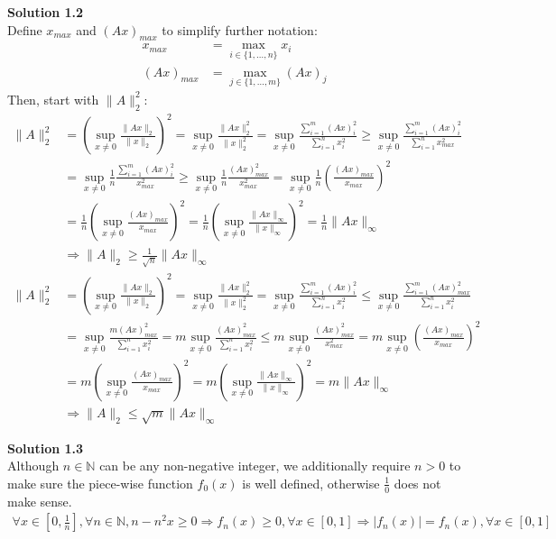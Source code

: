 \documentclass[fleqn, 10.5pt, a4paper]{article}
\def\N{{\mathbb N}}
\theoremstyle{definition}
\numberwithin{equation}{section}
\newcommand{\supx}{\sup_{x\neq0}}
\begin{document}
\noindent \textbf {Solution 1.2} \\
Define $x_{max}$ and $\left(Ax\right)_{max}$ to simplify further notation:
\begin{align*}
	x_{max} &= \max_{i\in\{1,\dots,n\}} x_i \\
	\left(Ax\right)_{max} &= \max_{j\in\{1,\dots,m\}}\left(Ax\right)_j
\end{align*}
Then, start with $\|A\|_2^2$:
\begin{align*}
\|A\|_2^2&=\left(\supx\frac{\|Ax\|_2}{\|x\|_2}\right)^2=\supx\frac{\|Ax\|_2^2}{\|x\|_2^2} = \supx \frac{\sum_{i=1}^{m} \left(Ax\right)_i^2}{\sum_{i=1}^{n} x_i^2} \geq \supx \frac{\sum_{i=1}^{m} \left(Ax\right)_i^2}{\sum_{i=1}^{n} x_{max}^2} \\
&=\supx \frac{1}{n}\frac{\sum_{i=1}^{m} \left(Ax\right)_i^2}{x_{max}^2} \geq \supx \frac{1}{n}\frac{\left(Ax\right)_{max}^2}{x_{max}^2} = \supx \frac{1}{n} \left(\frac{\left(Ax\right)_{max}}{x_{max}}\right)^2 \\
&= \frac{1}{n}  \left(\supx\frac{\left(Ax\right)_{max}}{x_{max}}\right)^2 =\frac{1}{n} \left(\supx \frac{\|Ax\|_\infty}{\|x\|_\infty}\right)^2= \frac{1}{n}\|Ax\|_\infty \\
&\Rightarrow \|A\|_2 \geq \frac{1}{\sqrt{n}}\|Ax\|_\infty
\end{align*}
\begin{align*}
\|A\|_2^2&=\left(\supx\frac{\|Ax\|_2}{\|x\|_2}\right)^2=\supx\frac{\|Ax\|_2^2}{\|x\|_2^2} = \supx \frac{\sum_{i=1}^{m} \left(Ax\right)_{i}^2}{\sum_{i=1}^{n} x_i^2} \leq \supx \frac{\sum_{i=1}^{m} \left(Ax\right)_{max}^2}{\sum_{i=1}^{n} x_{i}^2} \\&= \supx \frac{m \left(Ax\right)_{max}^2}{\sum_{i=1}^{n} x_{i}^2} = m\supx \frac{\left(Ax\right)_{max}^2}{\sum_{i=1}^{n} x_{i}^2} \leq m\supx \frac{\left(Ax\right)_{max}^2}{x_{max}^2} = m\supx \left(\frac{\left(Ax\right)_{max}}{x_{max}}\right)^2 \\
&=m\left(\supx \frac{\left(Ax\right)_{max}}{x_{max}}\right)^2 = m\left(\supx \frac{\|Ax\|_\infty}{\|x\|_\infty}\right)^2 = m\|Ax\|_\infty \\
&\Rightarrow \|A\|_2 \leq \sqrt{m}\|Ax\|_\infty
\end{align*}

\noindent \textbf {Solution 1.3} \\
Although $n\in\N$ can be any non-negative integer, we additionally require $n>0$ to make sure the piece-wise function $f_0(x)$ is well defined, otherwise $\frac{1}{0}$ does not make sense.
\begin{align*}
\forall x \in \left[0,\frac{1}{n}\right], \forall n \in \N, n - n^2 x \geq 0 \Rightarrow f_n (x) \geq 0, \forall x \in [0,1] \Rightarrow \lvert f_n(x) \rvert = f_n(x), \forall x \in [0,1] \\
\end{align*}
\end{document}
